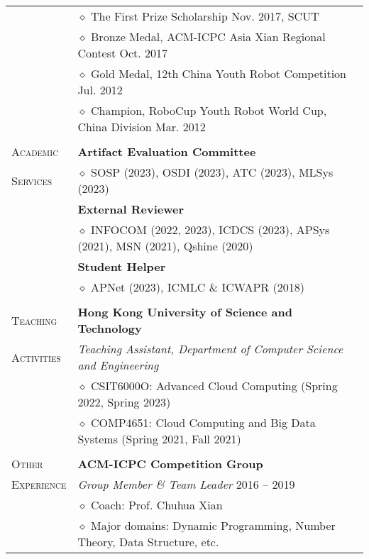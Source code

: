 \documentclass[letterpaper, 11pt]{article}
\begin{document}
\begin{longtable}{p{1in}p{5in}}
& $\diamond$ The First Prize Scholarship \hfill Nov. 2017, SCUT \\

& $\diamond$ Bronze Medal, ACM-ICPC Asia Xian Regional Contest \hfill Oct. 2017 \\

& $\diamond$ Gold Medal, 12th China Youth Robot Competition \hfill Jul. 2012 \\

& $\diamond$ Champion, RoboCup Youth Robot World Cup, China Division \hfill Mar. 2012 \\

& \\

{\textsc{Academic}}
& \textbf{Artifact Evaluation Committee} \\
{\textsc{Services}}
& $\diamond$ SOSP (2023), OSDI (2023), ATC (2023), MLSys (2023) \\
& \textbf{External Reviewer} \\
& $\diamond$ INFOCOM (2022, 2023), ICDCS (2023), APSys (2021), MSN (2021), Qshine (2020) \\
& \textbf{Student Helper} \\
& $\diamond$ APNet (2023), ICMLC \& ICWAPR (2018) \\
& \\

{\textsc{Teaching }}
& \textbf{Hong Kong University of Science and Technology} \\
{\textsc{Activities}}
& \textit{Teaching Assistant, Department of Computer Science and Engineering} \\
& $\diamond$ CSIT6000O: Advanced Cloud Computing (Spring 2022, Spring 2023) \\
& $\diamond$ COMP4651: Cloud Computing and Big Data Systems (Spring 2021, Fall 2021) \\
& \\

{\textsc{Other}}
& \textbf{ACM-ICPC Competition Group} \\
{\textsc{Experience}}
& \textit{Group Member \& Team Leader} \hfill 2016 -- 2019 \\
& $\diamond$ Coach: Prof. Chuhua Xian \\
& $\diamond$ Major domains: Dynamic Programming, Number Theory, Data Structure, etc. \\


\end{longtable}
\end{document}
